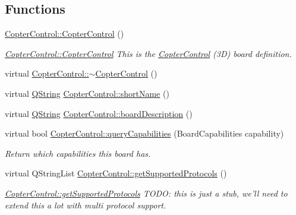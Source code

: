 \subsection*{\-Functions}
\begin{DoxyCompactItemize}
\item 
\hyperlink{group___boards___open_pilot_plugin_gadbec7022641a51cd87f98ca7dc734dcf}{\-Copter\-Control\-::\-Copter\-Control} ()
\begin{DoxyCompactList}\small\item\em \hyperlink{group___boards___open_pilot_plugin_gadbec7022641a51cd87f98ca7dc734dcf}{\-Copter\-Control\-::\-Copter\-Control} \-This is the \hyperlink{class_copter_control}{\-Copter\-Control} (3\-D) board definition. \end{DoxyCompactList}\item 
virtual \hyperlink{group___boards___open_pilot_plugin_ga42d298de6b0fb7cc74d9206f1cf18d40}{\-Copter\-Control\-::$\sim$\-Copter\-Control} ()
\item 
virtual \hyperlink{group___u_a_v_objects_plugin_gab9d252f49c333c94a72f97ce3105a32d}{\-Q\-String} \hyperlink{group___boards___open_pilot_plugin_ga0d1055d64f286350d10a89536e595046}{\-Copter\-Control\-::short\-Name} ()
\item 
virtual \hyperlink{group___u_a_v_objects_plugin_gab9d252f49c333c94a72f97ce3105a32d}{\-Q\-String} \hyperlink{group___boards___open_pilot_plugin_ga68dacf81a6b453c748b0403fa459a1e4}{\-Copter\-Control\-::board\-Description} ()
\item 
virtual bool \hyperlink{group___boards___open_pilot_plugin_ga5717283400c4b93b0c580a2af504a5d2}{\-Copter\-Control\-::query\-Capabilities} (\-Board\-Capabilities capability)
\begin{DoxyCompactList}\small\item\em \-Return which capabilities this board has. \end{DoxyCompactList}\item 
virtual \-Q\-String\-List \hyperlink{group___boards___open_pilot_plugin_ga5cf6a3278133728b41ab54897e6e8ef0}{\-Copter\-Control\-::get\-Supported\-Protocols} ()
\begin{DoxyCompactList}\small\item\em \hyperlink{group___boards___open_pilot_plugin_ga5cf6a3278133728b41ab54897e6e8ef0}{\-Copter\-Control\-::get\-Supported\-Protocols} \-T\-O\-D\-O\-: this is just a stub, we'll need to extend this a lot with multi protocol support. \end{DoxyCompactList}\item 

\end{DoxyCompactItemize}
